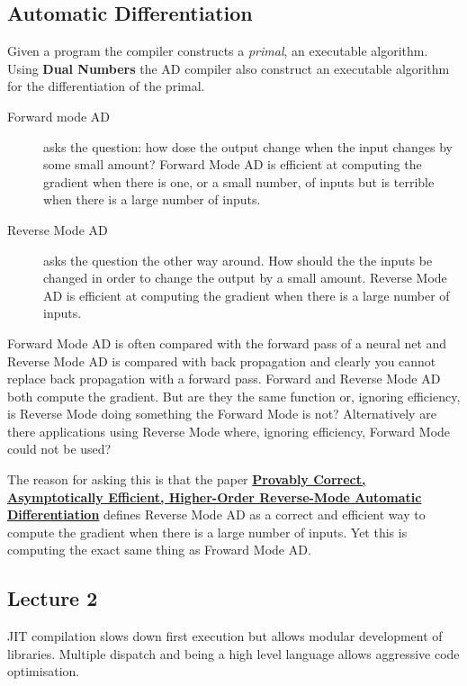 \subsection{Automatic Differentiation}
Given a program the compiler constructs a \emph{primal},  an executable algorithm. Using {\bf Dual Numbers} the AD compiler  also construct an executable algorithm for the differentiation of the primal. 
\begin{description}
\item [Forward mode AD] asks the question: how dose the output change when the input changes by some small amount?  Forward Mode AD is efficient at computing the gradient when there is one, or a small number, of inputs but is terrible when there is a large number of inputs.
\item [Reverse Mode AD] asks the question the other way around. How should the the inputs be changed  in order to change the output by a small amount. Reverse Mode AD is efficient at computing the gradient when there is a large number of inputs.
\end{description} 
Forward  Mode AD is often compared with the forward pass of a neural net and Reverse Mode AD is compared with back propagation and clearly you cannot replace back propagation with a forward pass.
Forward and Reverse Mode AD both compute the gradient. But are they the same function or, ignoring efficiency, is Reverse Mode doing something the Forward Mode is not? Alternatively are there applications using Reverse Mode where, ignoring efficiency, Forward  Mode could not be used?

The reason for asking this is that the paper \href{https://richarde.dev/papers/2022/ad/higher-order-ad.pdf}{\bf Provably Correct, Asymptotically Efficient, Higher-Order
Reverse-Mode Automatic Differentiation} defines Reverse Mode AD as a correct and efficient way to compute the gradient when there is a large number of inputs. Yet this is computing the exact same thing as  Froward Mode AD.


\subsection{Lecture 2}
JIT compilation slows down first execution but allows modular development of libraries.
Multiple dispatch and being a high level language allows aggressive code optimisation. 



